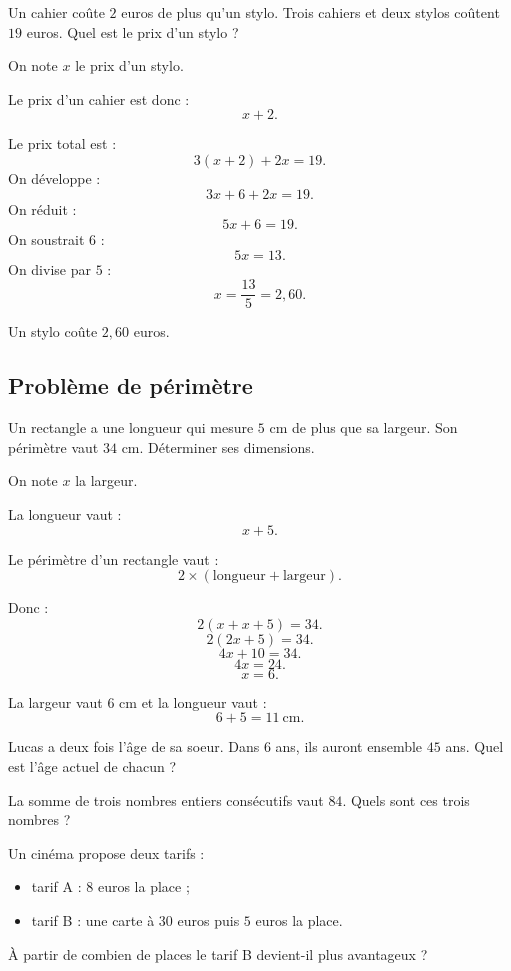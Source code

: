 \documentclass[11pt,a4paper]{article}
\newcounter{exercice}
\begin{document}
\begin{exemple}
Un cahier coûte $2$ euros de plus qu'un stylo. Trois cahiers et deux stylos coûtent $19$ euros. Quel est le prix d'un stylo ?

On note $x$ le prix d'un stylo.

Le prix d'un cahier est donc :
\[
x+2.
\]

Le prix total est :
\[
3(x+2)+2x=19.
\]
On développe :
\[
3x+6+2x=19.
\]
On réduit :
\[
5x+6=19.
\]
On soustrait $6$ :
\[
5x=13.
\]
On divise par $5$ :
\[
x=\frac{13}{5}=2{,}60.
\]

Un stylo coûte $2{,}60$ euros.
\end{exemple}

\subsection{Problème de périmètre}

\begin{exemple}
Un rectangle a une longueur qui mesure $5$ cm de plus que sa largeur. Son périmètre vaut $34$ cm. Déterminer ses dimensions.

On note $x$ la largeur.

La longueur vaut :
\[
x+5.
\]

Le périmètre d'un rectangle vaut :
\[
2\times(\text{longueur}+\text{largeur}).
\]

Donc :
\[
2(x+x+5)=34.
\]
\[
2(2x+5)=34.
\]
\[
4x+10=34.
\]
\[
4x=24.
\]
\[
x=6.
\]

La largeur vaut $6$ cm et la longueur vaut :
\[
6+5=11\ \text{cm}.
\]
\end{exemple}

\begin{exercice}
Lucas a deux fois l'âge de sa soeur. Dans $6$ ans, ils auront ensemble $45$ ans. Quel est l'âge actuel de chacun ?
\end{exercice}

\begin{exercice}
La somme de trois nombres entiers consécutifs vaut $84$. Quels sont ces trois nombres ?
\end{exercice}

\begin{exercice}
Un cinéma propose deux tarifs :
\begin{itemize}
  \item tarif A : $8$ euros la place ;
  \item tarif B : une carte à $30$ euros puis $5$ euros la place.
\end{itemize}
À partir de combien de places le tarif B devient-il plus avantageux ?
\end{exercice}
\end{document}
